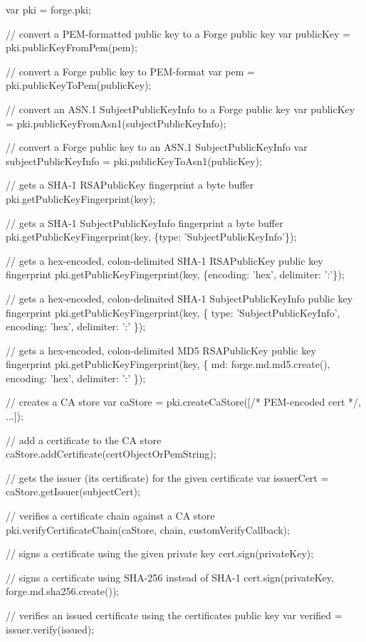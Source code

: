 \begin{DoxyCode}
var pki = forge.pki;

// convert a PEM-formatted public key to a Forge public key
var publicKey = pki.publicKeyFromPem(pem);

// convert a Forge public key to PEM-format
var pem = pki.publicKeyToPem(publicKey);

// convert an ASN.1 SubjectPublicKeyInfo to a Forge public key
var publicKey = pki.publicKeyFromAsn1(subjectPublicKeyInfo);

// convert a Forge public key to an ASN.1 SubjectPublicKeyInfo
var subjectPublicKeyInfo = pki.publicKeyToAsn1(publicKey);

// gets a SHA-1 RSAPublicKey fingerprint a byte buffer
pki.getPublicKeyFingerprint(key);

// gets a SHA-1 SubjectPublicKeyInfo fingerprint a byte buffer
pki.getPublicKeyFingerprint(key, \{type: 'SubjectPublicKeyInfo'\});

// gets a hex-encoded, colon-delimited SHA-1 RSAPublicKey public key fingerprint
pki.getPublicKeyFingerprint(key, \{encoding: 'hex', delimiter: ':'\});

// gets a hex-encoded, colon-delimited SHA-1 SubjectPublicKeyInfo public key fingerprint
pki.getPublicKeyFingerprint(key, \{
  type: 'SubjectPublicKeyInfo',
  encoding: 'hex',
  delimiter: ':'
\});

// gets a hex-encoded, colon-delimited MD5 RSAPublicKey public key fingerprint
pki.getPublicKeyFingerprint(key, \{
  md: forge.md.md5.create(),
  encoding: 'hex',
  delimiter: ':'
\});

// creates a CA store
var caStore = pki.createCaStore([/* PEM-encoded cert */, ...]);

// add a certificate to the CA store
caStore.addCertificate(certObjectOrPemString);

// gets the issuer (its certificate) for the given certificate
var issuerCert = caStore.getIssuer(subjectCert);

// verifies a certificate chain against a CA store
pki.verifyCertificateChain(caStore, chain, customVerifyCallback);

// signs a certificate using the given private key
cert.sign(privateKey);

// signs a certificate using SHA-256 instead of SHA-1
cert.sign(privateKey, forge.md.sha256.create());

// verifies an issued certificate using the certificates public key
var verified = issuer.verify(issued);


\end{DoxyCode}
